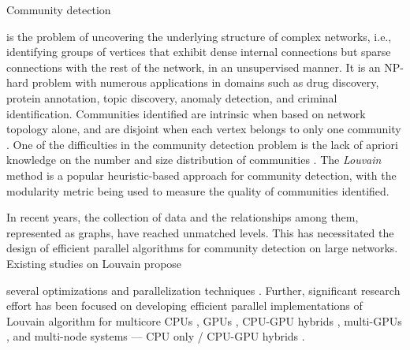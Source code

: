 Community detection is the problem of uncovering the underlying structure of complex networks, i.e., identifying groups of vertices that exhibit dense internal connections but sparse connections with the rest of the network, in an unsupervised manner. It is an NP-hard problem with numerous applications in domains such as drug discovery, protein annotation, topic discovery, anomaly detection, and criminal identification. Communities identified are intrinsic when based on network topology alone, and are disjoint when each vertex belongs to only one community \cite{com-gregory10}. One of the difficulties in the community detection problem is the lack of apriori knowledge on the number and size distribution of communities \cite{com-blondel08}. The \textit{Louvain} method \cite{com-blondel08} is a popular heuristic-based approach for community detection, with the modularity metric \cite{com-newman06} being used to measure the quality of communities identified.

In recent years, the collection of data and the relationships among them, represented as graphs, have reached unmatched levels. This has necessitated the design of efficient parallel algorithms for community detection on large networks. Existing studies on Louvain propose several optimizations \cite{com-rotta11, com-waltman13, com-gach14, com-traag15, com-lu15, com-ryu16, com-ozaki16, com-naim17, com-halappanavar17, com-ghosh18, com-traag19, com-zhang21, com-shi21, com-you22, com-aldabobi22} and parallelization techniques \cite{com-cheong13, com-wickramaarachchi14, com-lu15, com-zeng15, com-que15, com-naim17, com-fazlali17, com-halappanavar17, com-zeitz17, com-ghosh18, com-bhowmik19, com-gheibi20, com-shi21, com-bhowmick22}. Further, significant research effort has been focused on developing efficient parallel implementations of Louvain algorithm for multicore CPUs \cite{staudt2015engineering, staudt2016networkit, com-fazlali17, com-halappanavar17, qie2022isolate}, GPUs \cite{com-naim17}, CPU-GPU hybrids \cite{com-bhowmik19, com-mohammadi20}, multi-GPUs \cite{com-cheong13, kang2023cugraph, chou2022batched, com-gawande22}, and multi-node systems --- CPU only \cite{com-ghosh18, ghosh2018scalable, sattar2022scalable} / CPU-GPU hybrids \cite{com-bhowmick22}.

